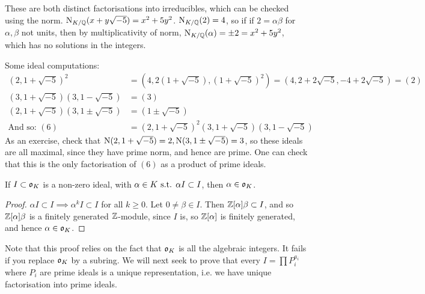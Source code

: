 \documentclass[10pt,a4paper]{article}
\begin{document}
These are both distinct factorisations into irreducibles, which can be checked using the norm. $\operatorname{N}_{K/\mathbb{Q}}(x+y\sqrt{-5}) = x^2+5y^2$. $\operatorname{N}_{K/\mathbb{Q}}(2) = 4$, so if if $2=\alpha\beta$ for $\alpha, \beta$ not units, then by multiplicativity of norm, $\operatorname{N}_{K/\mathbb{Q}}(\alpha) = \pm 2 = x^2+5y^2$, which has no solutions in the integers.

Some ideal computations:
\begin{align*}
\left(2,1+\sqrt{-5}\right)^2 &= \left(4,2(1+\sqrt{-5}),(1+\sqrt{-5})^2\right) = \left(4,2+2\sqrt{-5},-4+2\sqrt{-5}\right) = (2)\\
(3, 1+\sqrt{-5})(3, 1-\sqrt{-5}) &= (3)\\
(2, 1+\sqrt{-5})(3, 1\pm\sqrt{-5}) &= (1\pm \sqrt{-5})\\
\text{And so: }(6) &= (2, 1+\sqrt{-5})^2(3,1+\sqrt{-5})(3,1-\sqrt{-5})
\end{align*}
As an exercise, check that $\operatorname{N}(2, 1+\sqrt{-5}) = 2, \operatorname{N}(3, 1\pm\sqrt{-5})=3$, so these ideals are all maximal, since they have prime norm, and hence are prime. One can check that this is the only factorisation of $(6)$ as a product of prime ideals.

\begin{lemma}
If $I \subset \mathfrak{o}_K$ is a non-zero ideal, with $\alpha \in K \text{ s.t. } \alpha I \subset I$, then $\alpha \in \mathfrak{o}_K$.
\end{lemma}
\begin{proof}
$\alpha I \subset I \implies \alpha^k I \subset I$ for all $k \geq 0$. Let $0 \neq \beta \in I$. Then $\mathbb{Z}[\alpha]\beta \subset I$, and so $\mathbb{Z}[\alpha]\beta$ is a finitely generated $\mathbb{Z}$-module, since $I$ is, so $\mathbb{Z}[\alpha]$ is finitely generated, and hence $\alpha \in \mathfrak{o}_K$.
\end{proof}
Note that this proof relies on the fact that $\mathfrak{o}_K$ is all the algebraic integers. It fails if you replace $\mathfrak{o}_K$ by a subring. We will next seek to prove that every $I = \prod P_i^{a_i}$ where $P_i$ are prime ideals is a unique representation, i.e. we have unique factorisation into prime ideals. 
\end{document}
